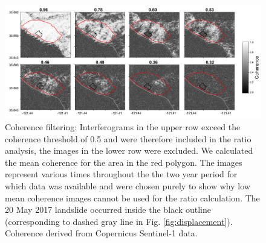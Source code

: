 \documentclass[nhess, manuscript]{copernicus}
\begin{document}

\begin{figure}
    \centering
    \includegraphics[width = \textwidth]{coherence_filter_sample_1.pdf}
    \caption{Coherence filtering: Interferograms in the upper row exceed the coherence threshold of 0.5 and were therefore included in the ratio analysis, the images in the lower row were excluded. We calculated the mean coherence for the area in the red polygon. The images represent various times throughout the the two year period for which data was available and were chosen purely to show why low mean coherence images cannot be used for the ratio calculation. The 20 May 2017 landslide occurred inside the black outline (corresponding to dashed gray line in Fig. \ref{fig:displacement}). Coherence derived from Copernicus Sentinel-1 data.}
    \label{fig:coherence_filter}
\end{figure}
\end{document}
